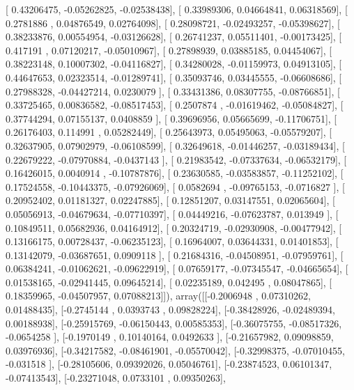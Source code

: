 \documentclass{article}
\begin{document}
       [ 0.43206475, -0.05262825, -0.02538438],
       [ 0.33989306,  0.04664841,  0.06318569],
       [ 0.2781886 ,  0.04876549,  0.02764098],
       [ 0.28098721, -0.02493257, -0.05398627],
       [ 0.38233876,  0.00554954, -0.03126628],
       [ 0.26741237,  0.05511401, -0.00173425],
       [ 0.417191  ,  0.07120217, -0.05010967],
       [ 0.27898939,  0.03885185,  0.04454067],
       [ 0.38223148,  0.10007302, -0.04116827],
       [ 0.34280028, -0.01159973,  0.04913105],
       [ 0.44647653,  0.02323514, -0.01289741],
       [ 0.35093746,  0.03445555, -0.06608686],
       [ 0.27988328, -0.04427214,  0.0230079 ],
       [ 0.33431386,  0.08307755, -0.08766851],
       [ 0.33725465,  0.00836582, -0.08517453],
       [ 0.2507874 , -0.01619462, -0.05084827],
       [ 0.37744294,  0.07155137,  0.0408859 ],
       [ 0.39696956,  0.05665699, -0.11706751],
       [ 0.26176403,  0.114991  ,  0.05282449],
       [ 0.25643973,  0.05495063, -0.05579207],
       [ 0.32637905,  0.07902979, -0.06108599],
       [ 0.32649618, -0.01446257, -0.03189434],
       [ 0.22679222, -0.07970884, -0.0437143 ],
       [ 0.21983542, -0.07337634, -0.06532179],
       [ 0.16426015,  0.0040914 , -0.10787876],
       [ 0.23630585, -0.03583857, -0.11252102],
       [ 0.17524558, -0.10443375, -0.07926069],
       [ 0.0582694 , -0.09765153, -0.0716827 ],
       [ 0.20952402,  0.01181327,  0.02247885],
       [ 0.12851207,  0.03147551,  0.02065604],
       [ 0.05056913, -0.04679634, -0.07710397],
       [ 0.04449216, -0.07623787,  0.013949  ],
       [ 0.10849511,  0.05682936,  0.04164912],
       [ 0.20324719, -0.02930908, -0.00477942],
       [ 0.13166175,  0.00728437, -0.06235123],
       [ 0.16964007,  0.03644331,  0.01401853],
       [ 0.13142079, -0.03687651,  0.0909118 ],
       [ 0.21684316, -0.04508951, -0.07959761],
       [ 0.06384241, -0.01062621, -0.09622919],
       [ 0.07659177, -0.07345547, -0.04665654],
       [ 0.01538165, -0.02941445,  0.09645214],
       [ 0.02235189,  0.042495  ,  0.08047865],
       [ 0.18359965, -0.04507957,  0.07088213]]), array([[-0.2006948 ,  0.07310262,  0.01488435],
       [-0.2745144 ,  0.0393743 ,  0.09828224],
       [-0.38428926, -0.02489394,  0.00188938],
       [-0.25915769, -0.06150443,  0.00585353],
       [-0.36075755, -0.08517326, -0.0654258 ],
       [-0.1970149 ,  0.10140164,  0.0492633 ],
       [-0.21657982,  0.09098859,  0.03976936],
       [-0.34217582, -0.08461901, -0.05570042],
       [-0.32998375, -0.07010455, -0.031518  ],
       [-0.28105606,  0.09392026,  0.05046761],
       [-0.23874523,  0.06101347, -0.07413543],
       [-0.23271048,  0.0733101 ,  0.09350263],
\end{document}
